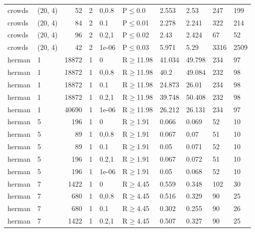 \begin{longtable}{llrrllllll}
 crowds        & (20, 4)   &     	52 &    2 & 0,0.8 & P$\leq$0.0   & 2.553   & 2.53     & 247    & 199    \\
 crowds        & (20, 4)   &     	84 &    2 & 0.1   & P$\leq$0.01  & 2.278   & 2.241    & 322    & 214    \\
 crowds        & (20, 4)   &     	96 &    2 & 0.2,1 & P$\leq$0.02  & 2.43    & 2.424    & 67     & 52     \\
 crowds        & (20, 4)   &     	42 &    2 & 1e-06 & P$\leq$0.03  & 5.971   & 5.29     & 3316   & 2509   \\
 herman        & 1         &  	18872 &    1 & 0     & R$\geq$11.98 & 41.034  & 49.798   & 234    & 97     \\
 herman        & 1         &  	18872 &    1 & 0,0.8 & R$\geq$11.98 & 40.2    & 49.084   & 232    & 98     \\
 herman        & 1         &  	18872 &    1 & 0.1   & R$\geq$11.98 & 24.873  & 26.01    & 234    & 98     \\
 herman        & 1         &  	18872 &    1 & 0.2,1 & R$\geq$11.98 & 39.748  & 50.408   & 232    & 98     \\
 herman        & 1         &  	40690 &    1 & 1e-06 & R$\geq$11.98 & 26.212  & 26.131   & 234    & 97     \\
 herman        & 5         &    	196 &    1 & 0     & R$\geq$1.91  & 0.066   & 0.069    & 52     & 10     \\
 herman        & 5         &     	89 &    1 & 0,0.8 & R$\geq$1.91  & 0.067   & 0.07     & 51     & 10     \\
 herman        & 5         &     	89 &    1 & 0.1   & R$\geq$1.91  & 0.05    & 0.071    & 52     & 10     \\
 herman        & 5         &    	196 &    1 & 0.2,1 & R$\geq$1.91  & 0.067   & 0.072    & 51     & 10     \\
 herman        & 5         &    	196 &    1 & 1e-06 & R$\geq$1.91  & 0.05    & 0.068    & 52     & 10     \\
 herman        & 7         &   	1422 &    1 & 0     & R$\geq$4.45  & 0.559   & 0.348    & 102    & 30     \\
 herman        & 7         &    	680 &    1 & 0,0.8 & R$\geq$4.45  & 0.516   & 0.329    & 90     & 25     \\
 herman        & 7         &    	680 &    1 & 0.1   & R$\geq$4.45  & 0.302   & 0.255    & 90     & 26     \\
 herman        & 7         &   	1422 &    1 & 0.2,1 & R$\geq$4.45  & 0.507   & 0.327    & 90     & 25     \\

\end{longtable}
